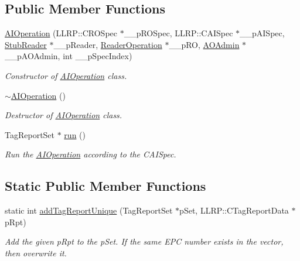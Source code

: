 \subsection*{Public Member Functions}
\begin{DoxyCompactItemize}
\item 
\hyperlink{class_e_l_f_i_n_1_1_a_i_operation_a77f1def7da7b7712981030a08746513e}{A\-I\-Operation} (L\-L\-R\-P\-::\-C\-R\-O\-Spec $\ast$\-\_\-\-\_\-p\-R\-O\-Spec, L\-L\-R\-P\-::\-C\-A\-I\-Spec $\ast$\-\_\-\-\_\-p\-A\-I\-Spec, \hyperlink{class_e_l_f_i_n_1_1_stub_reader}{Stub\-Reader} $\ast$\-\_\-\-\_\-p\-Reader, \hyperlink{class_e_l_f_i_n_1_1_reader_operation}{Reader\-Operation} $\ast$\-\_\-\-\_\-p\-R\-O, \hyperlink{class_e_l_f_i_n_1_1_a_o_admin}{A\-O\-Admin} $\ast$\-\_\-\-\_\-p\-A\-O\-Admin, int \-\_\-\-\_\-p\-Spec\-Index)
\begin{DoxyCompactList}\small\item\em Constructor of \hyperlink{class_e_l_f_i_n_1_1_a_i_operation}{A\-I\-Operation} class. \end{DoxyCompactList}\item 
\hyperlink{class_e_l_f_i_n_1_1_a_i_operation_a95756463bda120c3ce5290f5dffc9747}{$\sim$\-A\-I\-Operation} ()
\begin{DoxyCompactList}\small\item\em Destructor of \hyperlink{class_e_l_f_i_n_1_1_a_i_operation}{A\-I\-Operation} class. \end{DoxyCompactList}\item 
Tag\-Report\-Set $\ast$ \hyperlink{class_e_l_f_i_n_1_1_a_i_operation_a13259c8516e1b5fb465e553c4c5dae01}{run} ()
\begin{DoxyCompactList}\small\item\em Run the \hyperlink{class_e_l_f_i_n_1_1_a_i_operation}{A\-I\-Operation} according to the C\-A\-I\-Spec. \end{DoxyCompactList}\end{DoxyCompactItemize}
\subsection*{Static Public Member Functions}
\begin{DoxyCompactItemize}
\item 
static int \hyperlink{class_e_l_f_i_n_1_1_a_i_operation_ac37fc39b75785f9188b02cb62988dd18}{add\-Tag\-Report\-Unique} (Tag\-Report\-Set $\ast$p\-Set, L\-L\-R\-P\-::\-C\-Tag\-Report\-Data $\ast$p\-Rpt)
\begin{DoxyCompactList}\small\item\em Add the given p\-Rpt to the p\-Set. If the same E\-P\-C number exists in the vector, then overwrite it. \end{DoxyCompactList}\end{DoxyCompactItemize}
